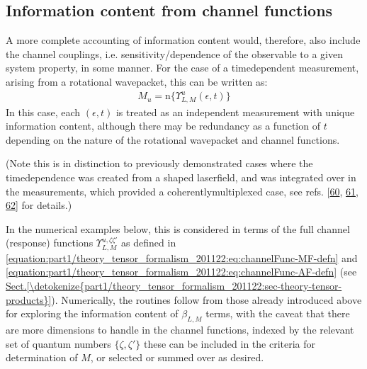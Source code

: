 \documentclass[letterpaper,table,10pt,english]{jupyterBook}
\begin{document}
\subsection{Information content from channel functions}
\label{\detokenize{part1/theory_info_content_221122:information-content-from-channel-functions}}
\sphinxAtStartPar
A more complete accounting of information content would, therefore, also
include the channel couplings, i.e. sensitivity/dependence of the
observable to a given system property, in some manner. For the case of a
time\sphinxhyphen{}dependent measurement, arising from a rotational wavepacket, this
can be written as:
\begin{equation*}
\begin{split}M_{u}=\mathrm{n}\{\varUpsilon_{L,M}^{u}(\epsilon,t)\}\end{split}
\end{equation*}
\sphinxAtStartPar
In this case, each \((\epsilon,t)\) is treated as an independent
measurement with unique information content, although there may be
redundancy as a function of \(t\) depending on the nature of the
rotational wavepacket and channel functions.

\sphinxAtStartPar
(Note this is in
distinction to previously demonstrated cases where the time\sphinxhyphen{}dependence
was created from a shaped laser\sphinxhyphen{}field, and was integrated over in the
measurements, which provided a coherently\sphinxhyphen{}multiplexed case, see refs.
{[}\hyperlink{cite.backmatter/bibliography:id556}{60}, \hyperlink{cite.backmatter/bibliography:id558}{61}, \hyperlink{cite.backmatter/bibliography:id557}{62}{]} for details.)

\sphinxAtStartPar
In the numerical examples below, this is considered in terms of the full channel (response) functions \(\varUpsilon_{L,M}^{u,\zeta\zeta'}\) as defined in \eqref{equation:part1/theory_tensor_formalism_201122:eq:channelFunc-MF-defn} and \eqref{equation:part1/theory_tensor_formalism_201122:eq:channelFunc-AF-defn} (see \hyperref[\detokenize{part1/theory_tensor_formalism_201122:sec-theory-tensor-products}]{Sect.\@ \ref{\detokenize{part1/theory_tensor_formalism_201122:sec-theory-tensor-products}}}). Numerically, the routines follow from those already introduced above for exploring the information content of \(\beta_{L,M}\) terms, with the caveat that there are more dimensions to handle in the channel functions, indexed by the relevant set of quantum numbers \(\{\zeta,\zeta'\}\) \sphinxhyphen{} these can be included in the criteria for determination of \(M\), or selected or summed over as desired.
\end{document}
